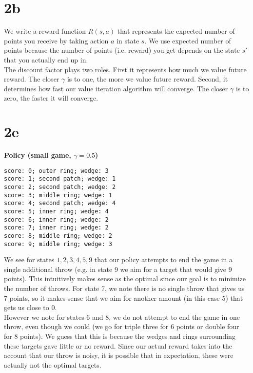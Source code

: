 \documentclass[12pt]{article}
\begin{document}
\section{2b}

We write a reward function $R(s, a)$ that represents the expected number of points you receive by taking action $a$ in state $s$. We use expected number of points because the number of points (i.e. reward) you get depends on the state $s'$ that you actually end up in. \\ 

The discount factor plays two roles. First it represents how much we value future reward. The closer $\gamma$ is to one, the more we value future reward. Second, it determines how fast our value iteration algorithm will converge. The closer $\gamma$ is to zero, the faster it will converge. \\

\section{2e}

\textbf{Policy (small game, $\gamma = 0.5$)}
\begin{verbatim}
score: 0; outer ring; wedge: 3
score: 1; second patch; wedge: 1
score: 2; second patch; wedge: 2
score: 3; middle ring; wedge: 1
score: 4; second patch; wedge: 4
score: 5; inner ring; wedge: 4
score: 6; inner ring; wedge: 2
score: 7; inner ring; wedge: 2
score: 8; middle ring; wedge: 2
score: 9; middle ring; wedge: 3
\end{verbatim}

We see for states $1, 2, 3, 4, 5, 9$ that our policy attempts to end the game in a single additional throw (e.g. in state 9 we aim for a target that would give 9 points). This intuitively makes sense as the optimal since our goal is to minimize the number of throws. For state 7, we note there is no single throw that gives us 7 points, so it makes sense that we aim for another amount (in this case 5) that gets us close to 0. \\

However we note for states 6 and 8, we do not attempt to end the game in one throw, even though we could (we go for triple three for 6 points or double four for 8 points). We guess that this is because the wedges and rings surrounding these targets gave little or no reward. Since our actual reward takes into the account that our throw is noisy, it is possible that in expectation, these were actually not the optimal targets.
\end{document}
